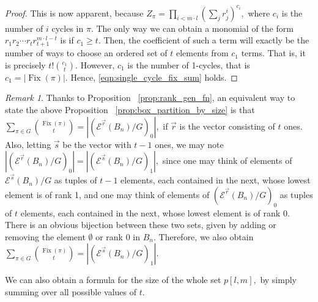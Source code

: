 \documentclass[10 pt]{amsart}
\theoremstyle{plain}
\theoremstyle{definition}
\theoremstyle{remark}
\newtheorem{rem}[thm]{Remark}
\numberwithin{equation}{section}
\renewcommand{\vec}[1]{\overrightarrow{#1}}
\def\Fix{\operatorname{Fix}}
\begin{document}
\begin{proof}
This is now apparent, because $Z_\pi = \prod_{i < m \cdot l} (\sum_j r_j^i)^{c_i},$ where $c_i$ is the number of $i$ cycles in $\pi.$ The only way we can obtain a monomial of the form $r_1 r_2 \cdots r_t r_{t+1}^{m\cdot l - t}$ is if $c_1 \geq t.$ Then, the coefficient of such a term will exactly be the number of ways to choose an ordered set of $t$ elements from $c_1$ terms. That is, it is precisely $t!\binom {c_1} t.$ However, $c_1$ is the number of 1-cycles, that is $c_1 = |\Fix(\pi)|.$ Hence, \eqref{eqn:single_cycle_fix_sum} holds.
\end{proof}

\begin{rem}
\label{rem:box_partitions_relation_to_f}
Thanks to Proposition ~\ref{prop:rank_gen_fn}, an equivalent way to state the above Proposition ~\ref{prop:box_partition_by_size} is that $\sum_{\pi \in G} \binom {\Fix(\pi)} t = |(\mathcal E^{\vec r}(B_n)/G)_0|,$ if $\vec r$ is the vector consisting of $t$ ones. Also, letting $\vec s$ be the vector with $t-1$ ones, we may note $ |(\mathcal E^{\vec r}(B_n)/G)_0| =  |(\mathcal E^{\vec s}(B_n)/G)_1|,$ since one may think of elements of 
$\mathcal E^{\vec s}(B_n)/G$ as tuples of $t-1$ elements, each contained in the next, whose lowest element is of rank 1, and one may think of elements of $(\mathcal E^{\vec r}(B_n)/G)_0$ as tuples of $t$ elements, each contained in the next, whose lowest element is of rank 0. There is an obvious bijection between these two sets, given by adding or removing the element $\emptyset$ or rank 0 in $B_n.$ Therefore, we also obtain $\sum_{\pi \in G} \binom {\Fix(\pi)} t = |(\mathcal E^{\vec s}(B_n)/G)_1|.$
\end{rem}

We can also obtain a formula for the size of the whole set $p[l,m],$ by simply summing over all possible values of $t.$
\end{document}
